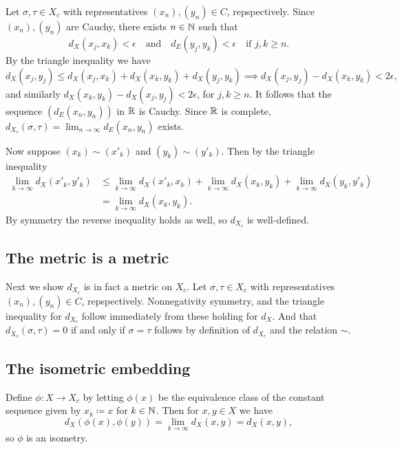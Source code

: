Let $\sigma, \tau \in X_c$ with representatives $(x_n),(y_n) \in C$,
repspectively. Since $(x_n),(y_n)$ are Cauchy, there exists $n \in \mathbb{N}$
such that
\[
d_X(x_j,x_k) < \epsilon \quad\text{and}\quad d_E(y_j,y_k) < \epsilon
\quad\text{if } j,k \ge n.
\]
By the triangle inequality we have
\[
  d_X(x_j,y_j) \le d_X(x_j,x_k) + d_X(x_k,y_k) + d_X(y_j,y_k) \implies
  d_X(x_j,y_j) - d_X(x_k,y_k) < 2\epsilon,
\]
and similarly $d_X(x_k,y_k) - d_X(x_j,y_j) < 2\epsilon$, for $j,k \ge
n$.  It follows that the sequence $(d_E(x_n,y_n))$ in $\mathbb{R}$ is
Cauchy. Since $\mathbb{R}$ is complete, $d_{X_c}(\sigma, \tau) = \lim_{n \to
  \infty} d_E(x_n,y_n)$ exists.

Now suppose $(x_k) \sim (x'_k)$ and $(y_k) \sim (y'_k)$. Then by the
triangle inequality
\begin{align*}
\lim_{k \to \infty} d_X(x'_k, y'_k) &\le \lim_{k \to \infty} d_X(x'_k,
x_k) + \lim_{k \to \infty} d_X(x_k, y_k) + \lim_{k \to \infty}
d_X(y_k, y'_k) \\ &= \lim_{k \to \infty} d_X(x_k, y_k).
\end{align*}
By symmetry the reverse inequality holds as well, so $d_{X_c}$ is
well-defined.


\subsection{The metric is a metric}

Next we show $d_{X_c}$ is in fact a metric on $X_c$. Let $\sigma,\tau
\in X_c$ with representatives $(x_n),(y_n) \in C$,
repspectively. Nonnegativity symmetry, and the triangle inequality for
$d_{X_c}$ follow immediately from these holding for $d_X$. And that
$d_{X_c}(\sigma, \tau) = 0$ if and only if $\sigma = \tau$ follows by
definition of $d_{X_c}$ and the relation $\sim$.


\subsection{The isometric embedding}

Define $\phi : X \to X_c$ by letting $\phi(x)$ be the equivalence
class of the constant sequence given by $x_k \coloneqq x$ for $k \in
\mathbb{N}$. Then for $x,y \in X$ we have
\[
d_X(\phi(x),\phi(y)) = \lim_{k \to \infty} d_X(x,y) = d_X(x,y),
\]
so $\phi$ is an isometry.

